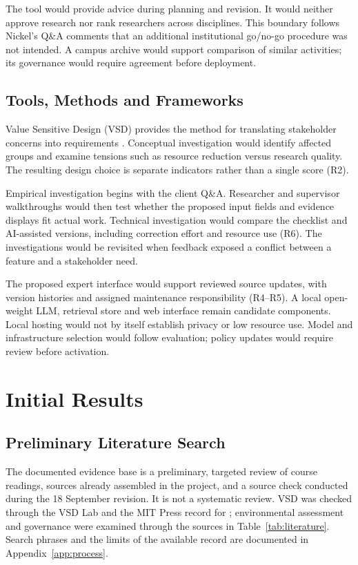 \documentclass[11pt,a4paper]{article}
\begin{document}
The tool would provide advice during planning and revision. It would neither approve research nor rank researchers across disciplines. This boundary follows Nickel's Q\&A comments that an additional institutional go/no-go procedure was not intended. A campus archive would support comparison of similar activities; its governance would require agreement before deployment.

\subsection{Tools, Methods and Frameworks}
Value Sensitive Design (VSD) provides the method for translating stakeholder concerns into requirements \citep{friedman2019shaping,vsdlab}. Conceptual investigation would identify affected groups and examine tensions such as resource reduction versus research quality. The resulting design choice is separate indicators rather than a single score (R2).

Empirical investigation begins with the client Q\&A. Researcher and supervisor walkthroughs would then test whether the proposed input fields and evidence displays fit actual work. Technical investigation would compare the checklist and AI-assisted versions, including correction effort and resource use (R6). The investigations would be revisited when feedback exposed a conflict between a feature and a stakeholder need.

The proposed expert interface would support reviewed source updates, with version histories and assigned maintenance responsibility (R4--R5). A local open-weight LLM, retrieval store and web interface remain candidate components. Local hosting would not by itself establish privacy or low resource use. Model and infrastructure selection would follow evaluation; policy updates would require review before activation.

\clearpage
\section{Initial Results}

\subsection{Preliminary Literature Search}
The documented evidence base is a preliminary, targeted review of course readings, sources already assembled in the project, and a source check conducted during the 18 September revision. It is not a systematic review. VSD was checked through the VSD Lab and the MIT Press record for \citet{friedman2019shaping}; environmental assessment and governance were examined through the sources in Table~\ref{tab:literature}. Search phrases and the limits of the available record are documented in Appendix~\ref{app:process}.
\end{document}

